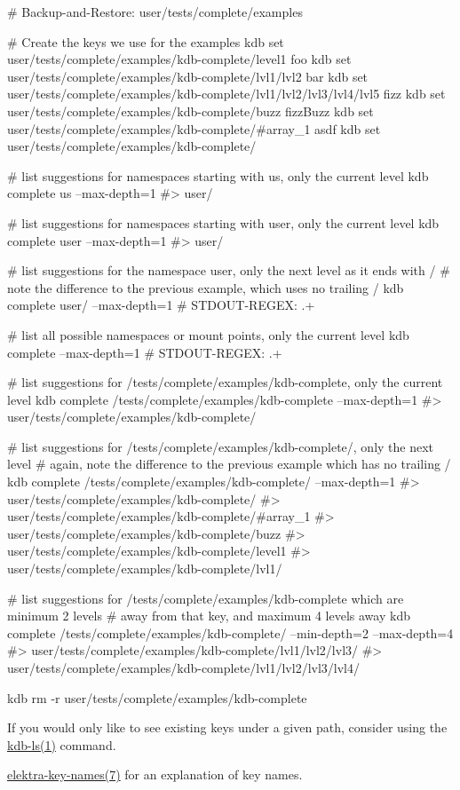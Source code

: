 \begin{DoxyCode}
# Backup-and-Restore: user/tests/complete/examples

# Create the keys we use for the examples
kdb set user/tests/complete/examples/kdb-complete/level1 foo
kdb set user/tests/complete/examples/kdb-complete/lvl1/lvl2 bar
kdb set user/tests/complete/examples/kdb-complete/lvl1/lvl2/lvl3/lvl4/lvl5 fizz
kdb set user/tests/complete/examples/kdb-complete/buzz fizzBuzz
kdb set user/tests/complete/examples/kdb-complete/#array\_1 asdf
kdb set user/tests/complete/examples/kdb-complete/%

# list suggestions for namespaces starting with us, only the current level
kdb complete us --max-depth=1
#> user/

# list suggestions for namespaces starting with user, only the current level
kdb complete user --max-depth=1
#> user/

# list suggestions for the namespace user, only the next level as it ends with /
# note the difference to the previous example, which uses no trailing /
kdb complete user/ --max-depth=1
# STDOUT-REGEX: .+

# list all possible namespaces or mount points, only the current level
kdb complete --max-depth=1
# STDOUT-REGEX: .+

# list suggestions for /tests/complete/examples/kdb-complete, only the current level
kdb complete /tests/complete/examples/kdb-complete --max-depth=1
#> user/tests/complete/examples/kdb-complete/

# list suggestions for /tests/complete/examples/kdb-complete/, only the next level
# again, note the difference to the previous example which has no trailing /
kdb complete /tests/complete/examples/kdb-complete/ --max-depth=1
#> user/tests/complete/examples/kdb-complete/%
#> user/tests/complete/examples/kdb-complete/#array\_1
#> user/tests/complete/examples/kdb-complete/buzz
#> user/tests/complete/examples/kdb-complete/level1
#> user/tests/complete/examples/kdb-complete/lvl1/

# list suggestions for /tests/complete/examples/kdb-complete which are minimum 2 levels
# away from that key, and maximum 4 levels away
kdb complete /tests/complete/examples/kdb-complete/ --min-depth=2 --max-depth=4
#> user/tests/complete/examples/kdb-complete/lvl1/lvl2/lvl3/
#> user/tests/complete/examples/kdb-complete/lvl1/lvl2/lvl3/lvl4/

kdb rm -r user/tests/complete/examples/kdb-complete
\end{DoxyCode}



\begin{DoxyItemize}
\item If you would only like to see existing keys under a given path, consider using the \hyperlink{doc_help_kdb-ls_md}{kdb-\/ls(1)} command.
\item \hyperlink{doc_help_elektra-key-names_md}{elektra-\/key-\/names(7)} for an explanation of key names. 
\end{DoxyItemize}